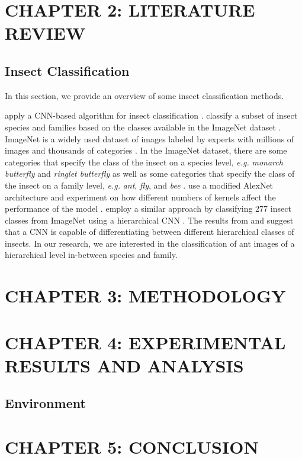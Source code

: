 \documentclass[12pt]{article}
\begin{document}
\section{CHAPTER 2: LITERATURE REVIEW}

\subsection{Insect Classification}

In this section, we provide an overview of some insect classification methods.

\citeauthor*{lim_performance_2017} apply a CNN-based algorithm for insect
classification \cite{lim_performance_2017}. \citeauthor*{lim_performance_2017}
classify a subset of insect species and families based on the classes available
in the ImageNet dataset \cite{deng_imagenet_2009}. ImageNet is a widely used
dataset of images labeled by experts with millions of images and thousands of
categories \cite{deng_imagenet_2009}. In the ImageNet dataset, there are some
categories that specify the class of the insect on a species level,
\textit{e.g.} \textit{monarch butterfly} and \textit{ringlet butterfly} as well
as some categories that specify the class of the insect on a family level,
\textit{e.g.} \textit{ant}, \textit{fly}, and \textit{bee}
\cite{imagenet_labels}. \citeauthor*{lim_performance_2017} use a modified
AlexNet architecture and experiment on how different numbers of kernels affect
the performance of the model \cite{lim_performance_2017}.
\citeauthor*{glick_insect_2016} employ a similar approach by classifying 277
insect classes from ImageNet using a hierarchical CNN \cite{glick_insect_2016}.
The results from \citeauthor*{lim_performance_2017} and
\citeauthor*{glick_insect_2016} suggest that a CNN is capable of differentiating
between different hierarchical classes of insects. In our research, we are
interested in the classification of ant images of a hierarchical level
in-between species and family.



\newpage
\section{CHAPTER 3: METHODOLOGY}

\newpage
\section{CHAPTER 4: EXPERIMENTAL RESULTS AND ANALYSIS}


\subsection{Environment}
\newpage
\section{CHAPTER 5: CONCLUSION}
\newpage

\printbibliography
\end{document}
